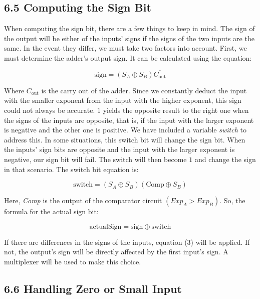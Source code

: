 \documentclass{article}
\begin{document}
\subsection*{6.5 Computing the Sign Bit}

When computing the sign bit, there are a few things to keep in mind. The sign of the output will be either of the inputs' signs if the signs of the two inputs are the same. In the event they differ, we must take two factors into account. First, we must determine the adder's output sign. It can be calculated using the equation:

\begin{equation}
    \text{sign} = (S_A \oplus S_B)\overline{C_{\text{out}}}
\end{equation}

Where $C_{\text{out}}$ is the carry out of the adder. Since we constantly deduct the input with the smaller exponent from the input with the higher exponent, this sign could not always be accurate. $1$ yields the opposite result to the right one when the signs of the inputs are opposite, that is, if the input with the larger exponent is negative and the other one is positive. We have included a variable \textit{switch} to address this. In some situations, this switch bit will change the sign bit. When the inputs' sign bits are opposite and the input with the larger exponent is negative, our sign bit will fail. The switch will then become $1$ and change the sign in that scenario. The switch bit equation is:

\begin{equation}
    \text{switch} = (S_A \oplus S_B)(\text{Comp} \oplus S_B)
\end{equation}

Here, \textit{Comp} is the output of the comparator circuit $(Exp_A > Exp_B)$. So, the formula for the actual sign bit:

\begin{equation}
    \text{actualSign} = \text{sign} \oplus \text{switch}
\end{equation}

If there are differences in the signs of the inputs, equation (3) will be applied. If not, the output's sign will be directly affected by the first input's sign. A multiplexer will be used to make this choice.

\subsection*{6.6 Handling Zero or Small Input}
\end{document}
